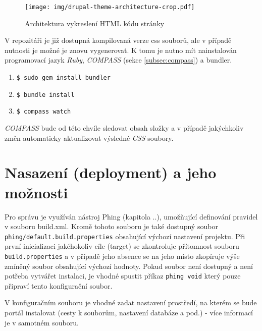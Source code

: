 \begin{figure}[]
  \texttt{[image: img/drupal-theme-architecture-crop.pdf]}
  \caption{Architektura vykreslení HTML kódu stránky}
  \label{fig:theme_architecture}
\end{figure}  

V repozitáři je již dostupná kompilovaná verze \gls{css} souborů, ale v případě nutnosti je možné je znovu vygenerovat. K tomu je nutno mít nainstalován programovací jazyk \emph{Ruby}, \emph{COMPASS} (sekce \ref{subsec:compass}) a \gls{bundler}.

\begin{enumerate}
  \item \texttt{\$ sudo gem install bundler}
  \item \texttt{\$ bundle install}
  \item \texttt{\$ compass watch}
\end{enumerate}

\emph{COMPASS} bude od této chvíle sledovat obsah složky a v případě jakýchkoliv změn automaticky aktualizovat výsledné \emph{CSS} soubory.

\section{Nasazení (deployment) a jeho možnosti}

Pro správu %
je využíván nástroj Phing (kapitola ..), umožňující definování pravidel v souboru build.xml. Kromě tohoto souboru je také dostupný soubor \linebreak \texttt{phing/\-default.build.properties} obsahující výchozí nastavení projektu. Při první inicializaci jakéhokoliv cíle (target) se zkontroluje přítomnost souboru \linebreak \texttt{build.properties} a v případě jeho absence se na jeho místo zkopíruje výše zmíněný soubor obsahující výchozí hodnoty. Pokud soubor není dostupný a není potřeba vytvářet instalaci, je vhodné spustit příkaz \texttt{phing void} který pouze připraví tento konfigurační soubor. 

V konfiguračním souboru je vhodné zadat nastavení prostředí, na kterém se bude portál instalovat (cesty k souborům, nastavení databáze a pod.) - více informací je v samotném souboru.

